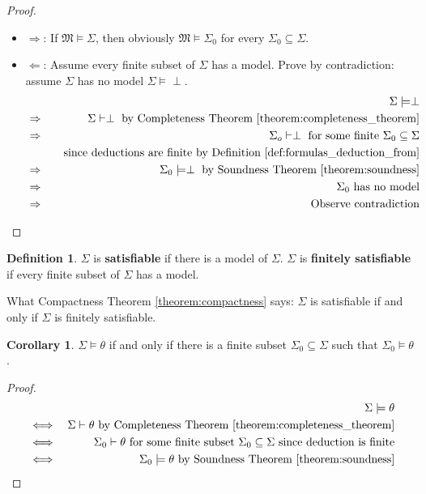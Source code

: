\documentclass[11pt,letterpaper]{book}
\theoremstyle{definition}
\newtheorem{definition}{Definition}[section]
\newtheorem{corollary}{Corollary}[section]
\begin{document}
\begin{proof}
     \begin{itemize}
     \item{$\Longrightarrow$: If $\mathfrak{M} \models \Sigma $, then
obviously $\mathfrak{M} \models \Sigma_0 $ for every $ \Sigma_0
\subseteq \Sigma $.}
     \item{$\Longleftarrow$: Assume every finite subset of $\Sigma$ has a
model. Prove by contradiction: assume $\Sigma$ has no model $\Sigma
\models \perp$.
         \begin{eqnarray*}
           & & \Sigma \models \perp \\
           &\Rightarrow & \Sigma \vdash \perp \text{ by Completeness
Theorem \ref{theorem:completeness_theorem}} \\
           &\Rightarrow & \Sigma_o \vdash \perp \text{ for some finite
$\Sigma_0 \subseteq \Sigma$} \\
& & \quad \text{since deductions are finite by Definition
\ref{def:formulas_deduction_from}} \\
           &\Rightarrow & \Sigma_0 \models \perp \text{ by Soundness
Theorem \ref{theorem:soundness}} \\
           &\Rightarrow & \Sigma_0 \text{ has no model} \\
           &\Rightarrow & \text{Observe contradiction}
         \end{eqnarray*}
}
     \end{itemize}
\end{proof}

\begin{definition}
$\Sigma$ is \textbf{satisfiable} if there is a model of $\Sigma$.
$\Sigma$ is \textbf{finitely satisfiable} if every finite subset of
$\Sigma$ has a model.
\end{definition}

What Compactness Theorem \ref{theorem:compactness} says: $\Sigma$ is
satisfiable if and only if $\Sigma$ is finitely satisfiable.


\begin{corollary}
     $\Sigma \models \theta $ if and only if there is a finite subset
$\Sigma_0 \subseteq \Sigma$ such that $\Sigma_0 \models \theta$.
\end{corollary}

\begin{proof}
     \begin{eqnarray*}
& &    \Sigma \models \theta  \\
& \iff & \Sigma \vdash \theta \text{ by Completeness
Theorem \ref{theorem:completeness_theorem}}  \\
& \iff & \Sigma_0 \vdash \theta \text{ for some finite subset $\Sigma_0
\subseteq \Sigma$ since deduction is finite} \\
& \iff & \Sigma_0 \models \theta \text{ by Soundness Theorem
\ref{theorem:soundness}}
     \end{eqnarray*}
\end{proof}
\end{document}
